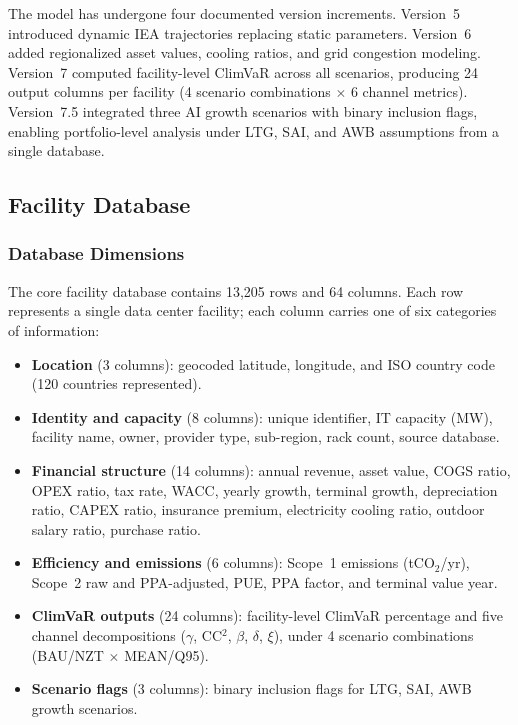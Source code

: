 The model has undergone four documented version increments. Version~5 introduced dynamic
IEA trajectories replacing static parameters. Version~6 added regionalized asset values,
cooling ratios, and grid congestion modeling. Version~7 computed facility-level ClimVaR
across all scenarios, producing 24 output columns per facility (4 scenario combinations
$\times$ 6 channel metrics). Version~7.5 integrated three AI growth scenarios with binary
inclusion flags, enabling portfolio-level analysis under LTG, SAI, and AWB assumptions
from a single database.



\subsection{Facility Database}
\label{app:database}

\subsubsection{Database Dimensions}

The core facility database contains 13{,}205 rows and 64 columns. Each row represents
a single data center facility; each column carries one of six categories of information:

\begin{itemize}
\item \textbf{Location} (3 columns): geocoded latitude, longitude, and ISO country code
(120 countries represented).
\item \textbf{Identity and capacity} (8 columns): unique identifier, IT capacity (MW),
facility name, owner, provider type, sub-region, rack count, source database.
\item \textbf{Financial structure} (14 columns): annual revenue, asset value, COGS ratio,
OPEX ratio, tax rate, WACC, yearly growth, terminal growth, depreciation ratio, CAPEX
ratio, insurance premium, electricity cooling ratio, outdoor salary ratio, purchase ratio.
\item \textbf{Efficiency and emissions} (6 columns): Scope~1 emissions (tCO$_2$/yr),
Scope~2 raw and PPA-adjusted, PUE, PPA factor, and terminal value year.
\item \textbf{ClimVaR outputs} (24 columns): facility-level ClimVaR percentage and five
channel decompositions ($\gamma$, CC$^2$, $\beta$, $\delta$, $\xi$), under 4 scenario
combinations (BAU/NZT $\times$ MEAN/Q95).
\item \textbf{Scenario flags} (3 columns): binary inclusion flags for LTG, SAI, AWB
growth scenarios.
\end{itemize}


